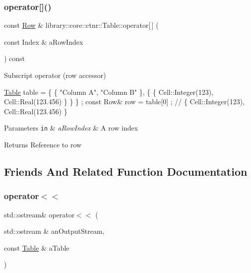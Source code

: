 \subsubsection{\texorpdfstring{operator[]()}{operator[]()}}
{\footnotesize\ttfamily const \hyperlink{classlibrary_1_1core_1_1ctnr_1_1table_1_1_row}{Row} \& library\+::core\+::ctnr\+::\+Table\+::operator\mbox{[}$\,$\mbox{]} (\begin{DoxyParamCaption}\item[{const Index \&}]{a\+Row\+Index }\end{DoxyParamCaption}) const}



Subscript operator (row accessor) 


\begin{DoxyCode}
\hyperlink{classlibrary_1_1core_1_1ctnr_1_1_table_a5b11121caa4288c3da642af7c6a5a632}{Table} table = \{ \{ \textcolor{stringliteral}{"Column A"}, \textcolor{stringliteral}{"Column B"} \}, \{ \{ Cell::Integer(123), Cell::Real(123.456) \} \} \} ;
\textcolor{keyword}{const} Row& row = table[0] ; \textcolor{comment}{// \{ Cell::Integer(123), Cell::Real(123.456) \}}
\end{DoxyCode}



\begin{DoxyParams}[1]{Parameters}
\mbox{\tt in}  & {\em a\+Row\+Index} & A row index \\
\hline
\end{DoxyParams}
\begin{DoxyReturn}{Returns}
Reference to row 
\end{DoxyReturn}


\subsection{Friends And Related Function Documentation}
\mbox{\label{classlibrary_1_1core_1_1ctnr_1_1_table_afaece709b2f143e4011941ae67b7adba}} 
\subsubsection{\texorpdfstring{operator$<$$<$}{operator<<}}
{\footnotesize\ttfamily std\+::ostream\& operator$<$$<$ (\begin{DoxyParamCaption}\item[{std\+::ostream \&}]{an\+Output\+Stream,  }\item[{const \hyperlink{classlibrary_1_1core_1_1ctnr_1_1_table}{Table} \&}]{a\+Table }\end{DoxyParamCaption})\hspace{0.3cm}{\ttfamily [friend]}}



